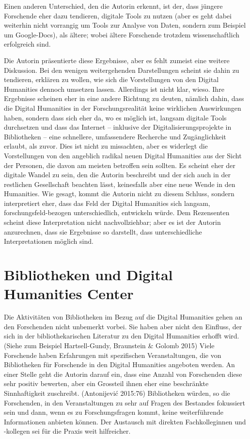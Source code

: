 \documentclass[a4paper,
fontsize=11pt,
oneside,
numbers=noperiodatend,
parskip=half-,
bibliography=totoc,
final
]{scrartcl}
\begin{document}
Einen anderen Unterschied, den die Autorin erkennt, ist der, dass
jüngere Forschende eher dazu tendieren, digitale Tools zu nutzen (aber
es geht dabei weiterhin nicht vorrangig um Tools zur Analyse von Daten,
sondern zum Beispiel um Google-Docs), als ältere; wobei ältere
Forschende trotzdem wissenschaftlich erfolgreich sind.

Die Autorin präsentierte diese Ergebnisse, aber es fehlt zumeist eine
weitere Diskussion. Bei den wenigen weitergehenden Darstellungen scheint
sie dahin zu tendieren, erklären zu wollen, wie sich die Vorstellungen
von den Digital Humanities dennoch umsetzen lassen. Allerdings ist nicht
klar, wieso. Ihre Ergebnisse scheinen eher in eine andere Richtung zu
deuten, nämlich dahin, dass die Digital Humanities in der
Forschungsrealität keine wirklichen Auswirkungen haben, sondern dass
sich eher da, wo es möglich ist, langsam digitale Tools durchsetzen und
dass das Internet -- inklusive der Digitalisierungsprojekte in
Bibliotheken -- eine schnellere, umfassendere Recherche und
Zugänglichkeit erlaubt, als zuvor. Dies ist nicht zu missachten, aber es
widerlegt die Vorstellungen von den angeblich radikal neuen Digital
Humanities aus der Sicht der Personen, die davon am meisten betroffen
sein sollten. Es scheint eher der digitale Wandel zu sein, den die
Autorin beschreibt und der sich auch in der restlichen Gesellschaft
beachten lässt, keinesfalls aber eine neue Wende in den Humanities. Wie
gesagt, kommt die Autorin nicht zu diesem Schluss, sondern interpretiert
eher, dass das Feld der Digital Humanities sich langsam,
forschungsfeld-bezogen unterschiedlich, entwickeln würde. Dem
Rezensenten scheint diese Interpretation nicht nachvollziehbar; aber es
ist der Autorin anzurechnen, dass sie Ergebnisse so darstellt, dass
unterschiedliche Interpretationen möglich sind.

\section*{Bibliotheken und Digital Humanities
Center}\label{bibliotheken-und-digital-humanities-center}

Die Aktivitäten von Bibliotheken im Bezug auf die Digital Humanities
gehen an den Forschenden nicht unbemerkt vorbei. Sie haben aber nicht
den Einfluss, der sich in der bibliothekarischen Literatur zu den
Digital Humanities erhofft wird. (Siehe zum Beispiel Hartsell-Gundy,
Braunstein \& Golomb 2015) Viele Forschende haben Erfahrungen mit
spezifischen Veranstaltungen, die von Bibliotheken für Forschende in den
Digital Humanities angeboten werden. An einer Stelle geht die Autorin
darauf ein, dass eine Anzahl von Forschenden diese sehr positiv
bewerten, aber ein Grossteil ihnen eher eine beschränkte Sinnhaftigkeit
zuschreibt. (Antonijević 2015:76) Bibliotheken würden, so die
Forschenden, in den Veranstaltungen zu sehr auf Fragen des Bestandes
fokussiert sein und dann, wenn es zu Forschungsfragen kommt, keine
weiterführende Informationen anbieten können. Der Austausch mit direkten
Fachkolleginnen und -kollegen sei für die Praxis weit hilfreicher.
\end{document}
